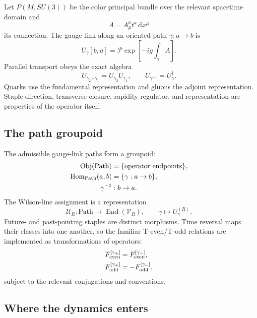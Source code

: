 \documentclass[11pt]{article}
\newcommand{\dd}{\mathrm{d}}
\newcommand{\Rep}{\mathcal V}
\newcommand{\Path}{\mathrm{Path}}
\newcommand{\Obj}{\operatorname{Obj}}
\newcommand{\Hom}{\operatorname{Hom}}
\begin{document}
Let \(P(M,SU(3))\) be the color principal bundle over the relevant spacetime
domain and
\begin{equation}
A=A_\mu^a t^a\,\dd x^\mu
\end{equation}
its connection.  The gauge link along an oriented path \(\gamma:a\to b\) is
\begin{equation}
U_\gamma[b,a]
=\mathcal P\exp\left[-ig\int_\gamma A\right].
\label{eq:holonomy}
\end{equation}
Parallel transport obeys the exact algebra
\begin{equation}
U_{\gamma_2\circ\gamma_1}
=U_{\gamma_2}U_{\gamma_1},
\qquad
U_{\gamma^{-1}}=U_\gamma^\dagger .
\label{eq:path-algebra}
\end{equation}
Quarks use the fundamental representation and gluons the adjoint
representation.  Staple direction, transverse closure, rapidity regulator,
and representation are properties of the operator itself.

\subsection{The path groupoid}

The admissible gauge-link paths form a groupoid:
\begin{align}
\Obj(\Path)&=\{\hbox{operator endpoints}\},\\
\Hom_{\Path}(a,b)&=\{\gamma:a\to b\},\\
\gamma^{-1}&:b\to a.
\end{align}
The Wilson-line assignment is a representation
\begin{equation}
\mathcal U_R:\Path\longrightarrow\operatorname{End}(\Rep_R),
\qquad
\gamma\longmapsto U_\gamma^{(R)}.
\label{eq:path-representation}
\end{equation}
Future- and past-pointing staples are distinct morphisms.  Time reversal maps
their classes into one another, so the familiar T-even/T-odd relations are
implemented as transformations of operators:
\begin{align}
F_{\rm even}^{[\gamma_+]}&=F_{\rm even}^{[\gamma_-]},\\
F_{\rm odd}^{[\gamma_+]}&=-F_{\rm odd}^{[\gamma_-]},
\label{eq:link-reversal}
\end{align}
subject to the relevant conjugations and conventions.

\subsection{Where the dynamics enters}
\end{document}
